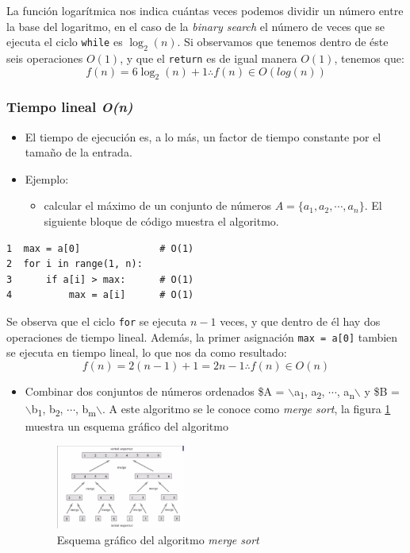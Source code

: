 \documentclass[letterpaper]{article}
\begin{document}
La función logarítmica nos indica cuántas veces podemos dividir un número entre
la base del logaritmo, en el caso de la \emph{binary search} el número de veces que
se ejecuta el ciclo \texttt{while} es \(\log_2(n)\). Si observamos que tenemos dentro de
éste seis operaciones \(O(1)\), y que el \texttt{return} es de igual manera \(O(1)\),
tenemos que:
$$
f(n) = 6 \log_2(n) + 1 \therefore f(n) \in O(log(n))
$$
\subsubsection{Tiempo lineal \emph{O(n)}}
\label{sec:orgdd3f08d}
\begin{itemize}
\item El tiempo de ejecución es, a lo más, un factor de tiempo constante por el
tamaño de la entrada.
\item Ejemplo:
\begin{itemize}
\item calcular el máximo de un conjunto de números
\(A = \{a_1, a_2, \cdots, a_n\}\). El siguiente bloque de código muestra el
algoritmo.
\end{itemize}
\end{itemize}
\begin{verbatim}
1  max = a[0]              # O(1)
2  for i in range(1, n):
3      if a[i] > max:      # O(1)
4          max = a[i]      # O(1)
\end{verbatim}

Se observa que el ciclo \texttt{for} se ejecuta \(n-1\) veces, y que dentro de él hay dos
operaciones de tiempo lineal. Además, la primer asignación \texttt{max = a[0]} tambien
se ejecuta en tiempo lineal, lo que nos da como resultado:
$$
    f(n) = 2 \left(n -1\right) + 1 = 2n - 1 \therefore f(n) \in O(n)
    $$
\begin{itemize}
\item Combinar dos conjuntos de números ordenados \$A = $\backslash${a\textsubscript{1}, a\textsubscript{2}, \(\cdots{}\), a\textsubscript{n}$\backslash$} y
\$B = $\backslash${b\textsubscript{1}, b\textsubscript{2}, \(\cdots{}\), b\textsubscript{m}$\backslash$}. A este algoritmo se le conoce como \emph{merge
sort}, la figura \ref{fig:merge_sort} muestra un esquema gráfico del algoritmo

\begin{figure}[htbp!]
\centering
\includegraphics[keepaspectratio,width=0.4\textwidth]{./img/merge_sort.png}
\caption{\label{fig:merge_sort}Esquema gráfico del algoritmo \emph{merge sort}}
\end{figure}
\end{itemize}
\end{document}
